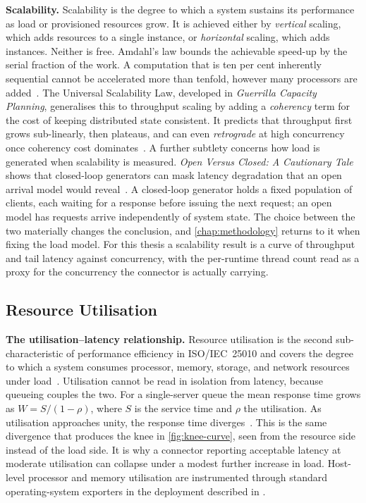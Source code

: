 \textbf{Scalability.} Scalability is the degree to which a system sustains its performance as load or provisioned resources grow. It is achieved either by \emph{vertical} scaling, which adds resources to a single instance, or \emph{horizontal} scaling, which adds instances. Neither is free. Amdahl's law bounds the achievable speed-up by the serial fraction of the work. A computation that is ten per cent inherently sequential cannot be accelerated more than tenfold, however many processors are added~\citep{amdahl1967validity}. The Universal Scalability Law, developed in \emph{Guerrilla Capacity Planning}, generalises this to throughput scaling by adding a \emph{coherency} term for the cost of keeping distributed state consistent. It predicts that throughput first grows sub-linearly, then plateaus, and can even \emph{retrograde} at high concurrency once coherency cost dominates~\citep{gunther2007guerrilla}. A further subtlety concerns how load is generated when scalability is measured. \emph{Open Versus Closed: A Cautionary Tale} shows that closed-loop generators can mask latency degradation that an open arrival model would reveal~\citep{schroeder2006open}. A closed-loop generator holds a fixed population of clients, each waiting for a response before issuing the next request; an open model has requests arrive independently of system state. The choice between the two materially changes the conclusion, and \cref{chap:methodology} returns to it when fixing the load model. For this thesis a scalability result is a curve of throughput and tail latency against concurrency, with the per-runtime thread count read as a proxy for the concurrency the connector is actually carrying.


\subsection{Resource Utilisation}\label{subsec:resource-util}

\textbf{The utilisation--latency relationship.} Resource utilisation is the second sub-characteristic of performance efficiency in ISO/IEC~25010 and covers the degree to which a system consumes processor, memory, storage, and network resources under load~\citep{iso25010}. Utilisation cannot be read in isolation from latency, because queueing couples the two. For a single-server queue the mean response time grows as $W = S/(1-\rho)$, where $S$ is the service time and $\rho$ the utilisation. As utilisation approaches unity, the response time diverges~\citep{jain1991art}. This is the same divergence that produces the knee in \cref{fig:knee-curve}, seen from the resource side instead of the load side. It is why a connector reporting acceptable latency at moderate utilisation can collapse under a modest further increase in load. Host-level processor and memory utilisation are instrumented through standard operating-system exporters in the deployment described in .

